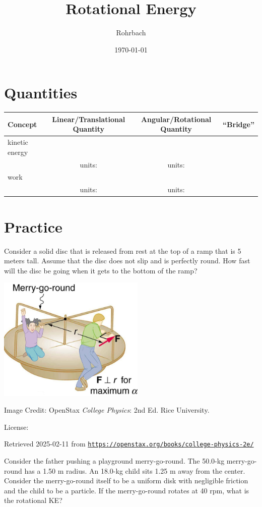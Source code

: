 \documentclass[10pt]{exam}
\title{Rotational Energy}
\author{Rohrbach}
\date{\today}
\begin{document}
\maketitle


\section*{Quantities}

\renewcommand{\arraystretch}{2}

\begin{tabular}{p{9em}ccp{6.5em}}
  Concept & Linear/Translational Quantity & Angular/Rotational Quantity & \hfill ``Bridge'' \\ \hline\hline
  kinetic energy \\[1em] & units: & units:  \\\hline
  work \\[1em] & units: & units:  \\\hline
\end{tabular}

\pagebreak


\section*{Practice}

Consider a solid disc that is released from rest at the top of a ramp that is 5 meters tall. Assume that the disc does not slip and is perfectly round. How fast will the disc be going when it gets to the bottom of the ramp?

\vs[2]

\pagebreak

\includegraphics[width=7cm]{merrygoround.jpg}


{\footnotesize Image Credit: OpenStax \emph{College Physics}: 2nd Ed. Rice University. }

{\footnotesize License:} \cc\hspace{-1em}

{\footnotesize Retrieved 2025-02-11 from \texttt{\href{https://openstax.org/books/college-physics-2e/pages/10-3-dynamics-of-rotational-motion-rotational-inertia}{https://openstax.org/books/college-physics-2e/}} }


\vspace{2em}
\noindent
Consider the father pushing a playground merry-go-round. The 50.0-kg merry-go-round has a 1.50 m radius.  An 18.0-kg child sits 1.25 m away from the center. Consider the merry-go-round itself to be a uniform disk with negligible friction and the child to be a particle.  If the merry-go-round rotates at 40 rpm, what is the rotational KE?
\end{document}
